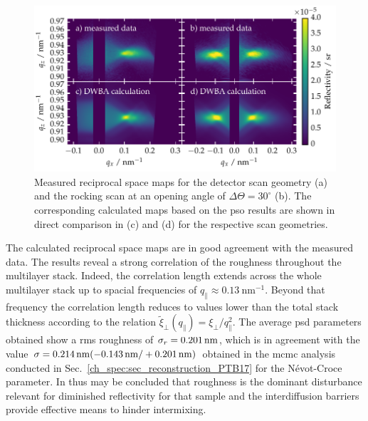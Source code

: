 \begin{figure}[htbp]
        \includegraphics[width=
        \textwidth]{img/PTB17_diffuse_simulation_vs_measurement} \caption{Measured  reciprocal space maps for the detector scan geometry (a) and the rocking scan at an opening angle of $\Delta\Theta=30^\circ$ (b). The corresponding calculated maps based on the \gls{pso} results are shown in direct comparison in (c) and (d) for the respective scan geometries.} \label{ch_diff:fig_PTB17_diffuse_comparisonWithTheory} 
\end{figure}
The calculated reciprocal space maps are in good agreement with the measured data. The results reveal a strong correlation of the roughness throughout the multilayer stack. Indeed, the correlation length extends across the whole multilayer stack up to spacial frequencies of $q_\parallel \approx \SI{0.13}{\nano\meter^{-1}}$. Beyond that frequency the correlation length reduces to values lower than the total stack thickness according to the relation $\tilde{\xi}_\perp(q_\parallel) = \xi_\perp / q_\parallel^2$. The average \gls{psd} parameters obtained show a \gls{rms} roughness of $\sigma_r=\nm{0.201}$, which is in agreement with the value $\sigma = \nm{0.214} (-\nm{0.143} / +\nm{0.201})$ obtained in the \gls{mcmc} analysis conducted in Sec.~\ref{ch_spec:sec_reconstruction_PTB17} for the N\'{e}vot-Croce parameter. In thus may be concluded that roughness is the dominant disturbance relevant for diminished reflectivity for that sample and the interdiffusion barriers provide effective means to hinder intermixing.

